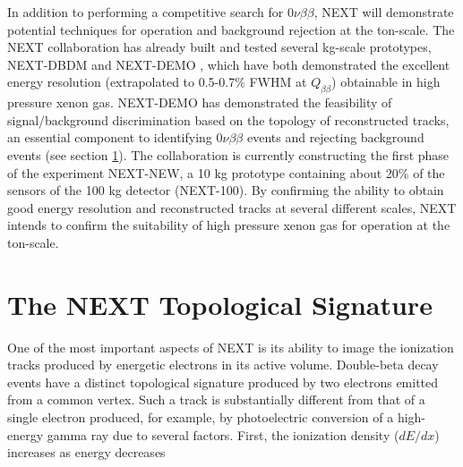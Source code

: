 \documentclass{JINST}
\begin{document}
In addition to performing a competitive search for $0\nu\beta\beta$, NEXT will demonstrate potential 
techniques for operation and background rejection at the ton-scale.  The NEXT collaboration has already built and tested several kg-scale prototypes, NEXT-DBDM \cite{Alvarez:2012kua} and
NEXT-DEMO \cite{Alvarez:2012xda,Alvarez:2012kua,Alvarez:2013gxa,Lorca:2014sra}, which have both demonstrated the excellent energy resolution (extrapolated to 0.5-0.7\% FWHM at
$Q_{\beta\beta}$) obtainable in high pressure xenon gas.  NEXT-DEMO has demonstrated the feasibility of signal/background discrimination based on the topology of reconstructed tracks,
an essential component to identifying $0\nu\beta\beta$ events and rejecting background events (see section \ref{sec:topology}).  The collaboration is currently constructing the first phase of the experiment NEXT-NEW, a 10 kg prototype 
containing about 20\% of the sensors of the 100 kg detector (NEXT-100).  By confirming the ability to obtain good energy resolution and reconstructed tracks at several different scales, NEXT 
intends to confirm the suitability of high pressure xenon gas for operation at the ton-scale.

\section{The NEXT Topological Signature}\label{sec:topology}
One of the most important aspects of NEXT is its ability to image the ionization tracks produced by energetic electrons in its active volume.  Double-beta decay events have a distinct
topological signature produced by two electrons emitted from a common vertex.  Such a track is substantially different from that of a single electron produced, for example, by photoelectric
conversion of a high-energy gamma ray due to several factors.  First, the ionization density ($dE/dx$) increases as energy decreases

%
%
\end{document}
